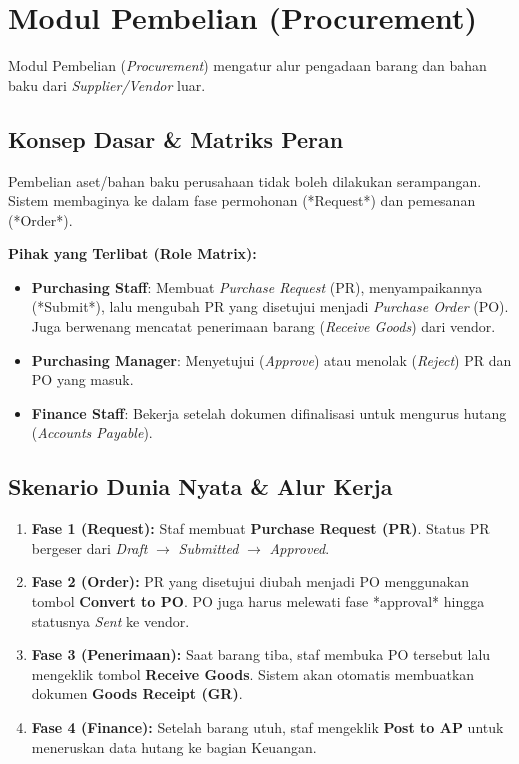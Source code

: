 \chapter{Modul Pembelian (Procurement)}

Modul Pembelian (\textit{Procurement}) mengatur alur pengadaan barang dan bahan baku dari \textit{Supplier/Vendor} luar. 

\section{Konsep Dasar \& Matriks Peran}
Pembelian aset/bahan baku perusahaan tidak boleh dilakukan serampangan. Sistem membaginya ke dalam fase permohonan (*Request*) dan pemesanan (*Order*).

\textbf{Pihak yang Terlibat (Role Matrix):}
\begin{itemize}
    \item \textbf{Purchasing Staff}: Membuat \textit{Purchase Request} (PR), menyampaikannya (*Submit*), lalu mengubah PR yang disetujui menjadi \textit{Purchase Order} (PO). Juga berwenang mencatat penerimaan barang (\textit{Receive Goods}) dari vendor.
    \item \textbf{Purchasing Manager}: Menyetujui (\textit{Approve}) atau menolak (\textit{Reject}) PR dan PO yang masuk.
    \item \textbf{Finance Staff}: Bekerja setelah dokumen difinalisasi untuk mengurus hutang (\textit{Accounts Payable}).
\end{itemize}

\section{Skenario Dunia Nyata \& Alur Kerja}
\begin{enumerate}
    \item \textbf{Fase 1 (Request):} Staf membuat \textbf{Purchase Request (PR)}. Status PR bergeser dari \textit{Draft} $\rightarrow$ \textit{Submitted} $\rightarrow$ \textit{Approved}.
    \item \textbf{Fase 2 (Order):} PR yang disetujui diubah menjadi PO menggunakan tombol \textbf{Convert to PO}. PO juga harus melewati fase *approval* hingga statusnya \textit{Sent} ke vendor.
    \item \textbf{Fase 3 (Penerimaan):} Saat barang tiba, staf membuka PO tersebut lalu mengeklik tombol \textbf{Receive Goods}. Sistem akan otomatis membuatkan dokumen \textbf{Goods Receipt (GR)}.
    \item \textbf{Fase 4 (Finance):} Setelah barang utuh, staf mengeklik \textbf{Post to AP} untuk meneruskan data hutang ke bagian Keuangan.
\end{enumerate}

